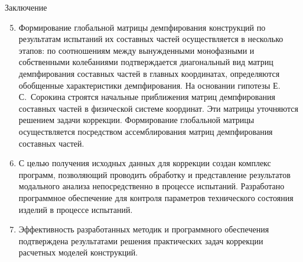 \begin{frame}{Заключение}
	\begin{enumerate}
		\setcounter{enumi}{4}
		\item Формирование глобальной матрицы демпфирования конструкций по результатам испытаний их составных частей осуществляется в несколько этапов: по соотношениям между вынужденными монофазными и собственными колебаниями подтверждается диагональный вид матриц демпфирования составных частей в главных координатах, определяются обобщенные характеристики демпфирования. На основании гипотезы Е.\,С.~Сорокина строятся начальные приближения матриц демпфирования составных частей в физической системе координат. Эти матрицы уточняются решением задачи коррекции. Формирование глобальной матрицы осуществляется посредством ассемблирования матриц демпфирования составных частей. 
		\item С целью получения исходных данных для коррекции создан комплекс программ, позволяющий проводить обработку и представление результатов модального анализа непосредственно в процессе испытаний. Разработано программное обеспечение для контроля параметров технического состояния изделий в процессе испытаний.
		\item Эффективность разработанных методик и программного обеспечения подтверждена результатами решения практических задач коррекции расчетных моделей конструкций.
	\end{enumerate}
\end{frame}